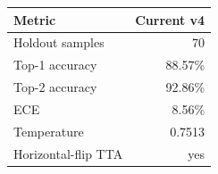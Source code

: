 \begin{tabular}{lr}
\toprule
Metric & Current v4 \\
\midrule
Holdout samples & 70 \\
Top-1 accuracy & 88.57\% \\
Top-2 accuracy & 92.86\% \\
ECE & 8.56\% \\
Temperature & 0.7513 \\
Horizontal-flip TTA & yes \\
\bottomrule
\end{tabular}
